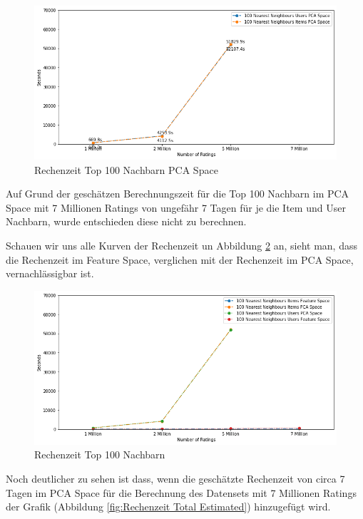 \begin{figure}[h!tb]
	\centering
	\includegraphics[keepaspectratio,width=\linewidth]{img/Time to Compute PCA.png} 
	\caption{Rechenzeit Top 100 Nachbarn PCA Space}
	\label{fig:Rechenzeit PCA}
\end{figure}

Auf Grund der geschätzen Berechnungszeit für die Top 100 Nachbarn im PCA Space mit 7 Millionen Ratings von ungefähr 7 Tagen für je die Item und User Nachbarn, wurde entschieden diese nicht zu berechnen.

Schauen wir uns alle Kurven der Rechenzeit un Abbildung \ref{fig:Rechenzeit Total}  an, sieht man, dass die Rechenzeit im Feature Space, verglichen mit der Rechenzeit im PCA Space, vernachlässigbar ist.

\begin{figure}[h!tb]
	\centering
	\includegraphics[keepaspectratio,width=\linewidth]{img/Time to Compute all 5MPCA.png} 
	\caption{Rechenzeit Top 100 Nachbarn}
	\label{fig:Rechenzeit Total}
\end{figure}

Noch deutlicher zu sehen ist dass, wenn die geschätzte Rechenzeit von circa 7 Tagen im PCA Space für die Berechnung des Datensets mit 7 Millionen Ratings der Grafik (Abbildung \ref{fig:Rechenzeit Total Estimated}) hinzugefügt wird. 

